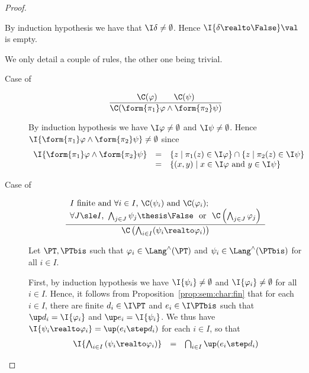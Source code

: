 \begin{proof}
\begin{description}
By induction hypothesis we have that $\I\delta \neq \emptyset$.
Hence $\I{\delta \realto \False}\val$ is empty.

\item[Rules for the consistency predicate $\C$ in Figure~\ref{fig:consist}.]
We only detail a couple of rules, the other one being trivial.
\begin{description}
\item[Case of]
\[
\dfrac{\C(\varphi) 
  \qquad
  \C(\psi)}
  {\C(\form{\pi_1}\varphi \land \form{\pi_2}\psi)}
\]

\noindent
By induction hypothesis we have $\I\varphi \neq \emptyset$
and $\I\psi \neq \emptyset$.
Hence $\I{\form{\pi_1}\varphi \land \form{\pi_2}\psi} \neq \emptyset$
since
\[
\begin{array}{l l l}
  \I{\form{\pi_1}\varphi \land \form{\pi_2}\psi}
& =
& \left\{ z \mid \pi_1(z) \in \I\varphi \right\}
  \cap
  \left\{ z \mid \pi_2(z) \in \I\psi \right\}
\\
%
& =
& \left\{ (x,y) \mid \text{$x \in \I\varphi$ and $y \in \I\psi$} \right\}
\end{array}
\]

\item[Case of]
\[
\dfrac{\begin{array}{l}
  \text{$I$ finite and $\forall i \in I$,}~
  \C(\psi_i) 
  ~\text{and}~
  \C(\varphi_i) ;
  \\
  \text{$\forall J \sle I$,}~
  \bigwedge_{j \in J} \psi_j \thesis \False
  ~~\text{or}~~
  \C\left( \bigwedge_{j \in J} \varphi_j \right)
  \end{array}}
  {\C\left( \bigwedge_{i \in I}(\psi_i \realto \varphi_i) \right)}
\]

\noindent
Let $\PT,\PTbis$ such that
$\varphi_i \in \Lang^\land(\PT)$ and $\psi_i \in \Lang^\land(\PTbis)$
for all $i \in I$.

First, by induction hypothesis 
we have
$\I{\psi_i} \neq \emptyset$
and
$\I{\varphi_i} \neq \emptyset$
for all $i \in I$.
Hence, it follows from Proposition~\ref{prop:sem:char:fin}
that for each $i \in I$,
there are finite $d_i \in \I\PT$
and $e_i \in \I\PTbis$
such that
$\up d_i = \I{\varphi_i}$
and
$\up e_i = \I{\psi_i}$.
We thus have
$\I{\psi_i \realto \varphi_i} = \up(e_i \step d_i)$
for each $i \in I$,
so that
\[
\begin{array}{l l l}
  \I{\bigwedge_{i \in I} \left( \psi_i \realto \varphi_i \right)}
& =
& \bigcap_{i \in I} \up(e_i \step d_i)
\end{array}
\]



\end{description}
\end{description}
\end{proof}
